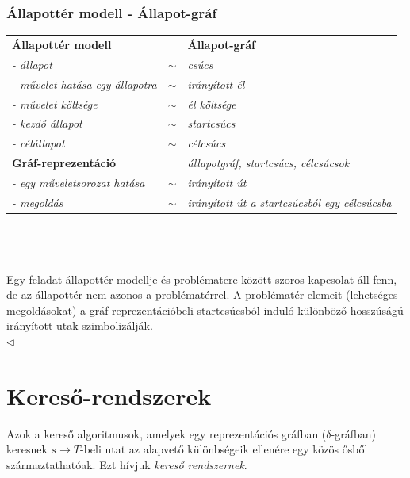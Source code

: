 \documentclass[12pt,margin=0px]{article}
\begin{document}
    \color{mygray} \subsubsection*{Állapottér modell - Állapot-gráf}
    \renewcommand{\arraystretch}{2}
    {\noindent \footnotesize \color{mygray}
    \begin{tabular}{lcl}
      \hline
       \textbf{Állapottér modell}               &  & \textbf{Állapot-gráf}
       \\
       \textit{ - állapot}                         & $\sim$ & \textit{csúcs}
       \\
       \textit{ - művelet hatása egy állapotra}    & $\sim$ & \textit{irányított él}
       \\
       \textit{ - művelet költsége}                & $\sim$ & \textit{él költsége}
       \\
       \textit{ - kezdő állapot}                   & $\sim$ & \textit{startcsúcs}
       \\
       \textit{ - célállapot}                      & $\sim$ & \textit{célcsúcs}
       \\
       \textbf{Gráf-reprezentáció}              &  & \textit{állapotgráf, startcsúcs, célcsúcsok}
       \\
       \textit{ - egy műveletsorozat hatása}       & $\sim$ & \textit{irányított út}
       \\
       \textit{ - megoldás}                        & $\sim$ & \textit{irányított út a startcsúcsból egy célcsúcsba}
       \\ \hline
    \end{tabular}
    \renewcommand{\arraystretch}{1}}\\\\\\
    \noindent Egy feladat állapottér modellje és problématere között szoros kapcsolat áll fenn, de az állapottér nem azonos a problématérrel. A problématér elemeit (lehetséges megoldásokat) a gráf reprezentációbeli startcsúcsból induló különböző hosszúságú irányított utak szimbolizálják.\\
	{\footnotesize $\triangleleft$ \faLightbulbO}

	\section*{Kereső-rendszerek}
	
    Azok a kereső algoritmusok, amelyek egy reprezentációs gráfban ($\delta$-gráfban) keresnek $s \rightarrow T$-beli utat az alapvető különbségeik ellenére egy közös ősből származtathatóak. Ezt hívjuk \emph{kereső rendszernek}.
\end{document}
